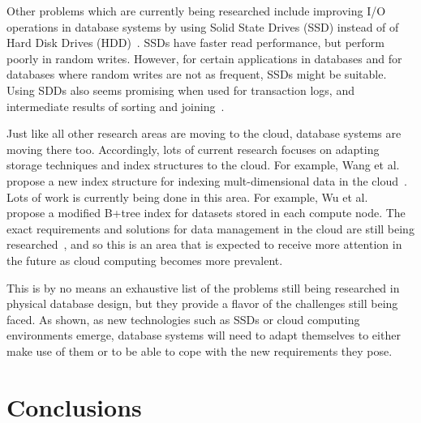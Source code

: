 \documentclass[12pt,a4paper]{article}
\begin{document}
Other problems which are currently being researched include improving I/O operations in database systems by using Solid State Drives (SSD) instead of of Hard
Disk Drives (HDD)~\cite{lee2009, du2009, lee2008}. SSDs have faster read performance, but perform poorly in random writes. However, for certain applications in
databases and for databases where random writes are not as frequent, SSDs might be suitable. Using SDDs also seems promising when used for
transaction logs, and intermediate results of sorting and joining~\cite{lee2008}.

Just like all other research areas are moving to the cloud, database systems are moving there too. Accordingly, lots of current research focuses on adapting
storage techniques and index structures to the cloud. For example, Wang et al. propose a new index structure for indexing mult-dimensional data in the
cloud~\cite{wang2010indexing}. Lots of work is currently being done in this area. For example, Wu et al.~\cite{wu2010efficient} propose a modified B+tree index
for datasets stored in each compute node. The exact requirements and solutions for data management in the cloud are still being
researched~\cite{abadi2009data}, and so this is an area that is expected to receive more attention in the future as cloud computing becomes more prevalent.


This is by no means an exhaustive list of the problems still being researched in physical database design, but they provide a flavor of the challenges still
being faced. As shown, as new technologies such as SSDs or cloud computing environments emerge, database systems will need to adapt themselves to either make
use of them or to be able to cope with the new requirements they pose. 

\section{Conclusions}
\label{SEC-CONCL}

%




\end{document}
